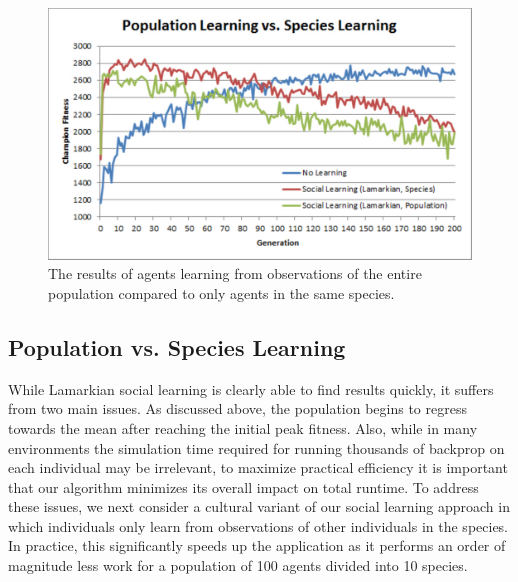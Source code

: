 \documentclass{acm_proc_article-sp}
\begin{document}

\begin{figure}
  \centering
    \includegraphics[scale=.35]{population_species.pdf}
  \caption{The results of agents learning from observations of the entire population compared to only agents in the same species.}
  \label{fig:population-species}
\end{figure}

\subsection*{Population vs. Species Learning}
While Lamarkian social learning is clearly able to find results quickly, it suffers from two main issues. As discussed above, the population begins to regress towards the mean after reaching the initial peak fitness. Also, while in many environments the simulation time required for running thousands of backprop on each individual may be irrelevant, to maximize practical efficiency it is important that our algorithm minimizes its overall impact on total runtime. To address these issues, we next consider a cultural variant of our social learning approach in which individuals only learn from observations of other individuals in the species. In practice, this significantly speeds up the application as it performs an order of magnitude less work for a population of 100 agents divided into 10 species.
\end{document}
